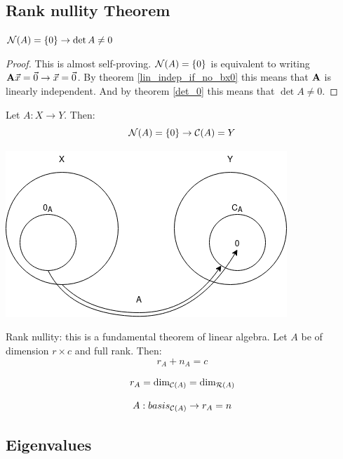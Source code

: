 \subsection{Rank nullity Theorem}


\begin{theorem}
    $ \mathcal{N}(A) = \{ 0 \} \to \det{A} \neq 0 $
\end{theorem}
\begin{proof}
    This is almost self-proving. 
    $\mathcal{N}(A) = \{ 0 \}$ is equivalent to writing $\mathbf{A} \vec{x} = \vec{0} \to \vec{x} = \vec{0}$.
    By theorem \ref{lin_indep_if_no_bx0} this means that $\mathbf{A}$ is linearly independent.
    And by theorem \ref{det_0} this means that $ \det{A} \neq 0 $.
\end{proof}


\begin{theorem}
    Let $A: X \to Y$. Then:
    $$ \mathcal{N}(A) = \{ 0 \} \to \mathcal{C}(A) = Y $$
\end{theorem}

\includegraphics[width=0.4\linewidth]{images/A_from_X_to_Y.png}

\begin{theorem}
    Rank nullity: this is a fundamental theorem of linear algebra.
    Let $A$ be of dimension $r \times c$ and full rank.
    Then: 
    $$ r_A + n_A = c $$
\end{theorem}


\begin{theorem}
    $$ r_A = \text{dim}_{\mathcal{C}(A)} = \text{dim}_{\mathcal{R}(A)} $$
\end{theorem}

\begin{theorem}
    $$ A:basis_{\mathcal{C}(A)} \to r_A = n $$
\end{theorem}












\subsection{Eigenvalues}

